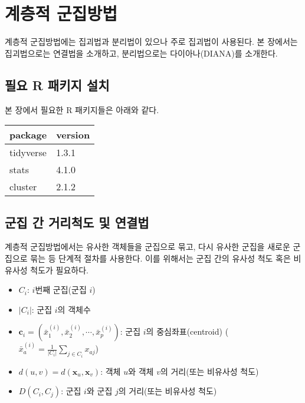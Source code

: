 \documentclass[
]{book}
\providecommand{\tightlist}{%
  \setlength{\itemsep}{0pt}\setlength{\parskip}{0pt}}
\begin{document}
\hypertarget{hierarchical-clustering}{%
\chapter{계층적 군집방법}\label{hierarchical-clustering}}

계층적 군집방법에는 집괴법과 분리법이 있으나 주로 집괴법이 사용된다. 본 장에서는 집괴법으로는 연결법을 소개하고, 분리법으로는 다이아나(DIANA)를 소개한다.

\hypertarget{hierarchical-clustering-packages-install}{%
\section{필요 R 패키지 설치}\label{hierarchical-clustering-packages-install}}

본 장에서 필요한 R 패키지들은 아래와 같다.

\begin{tabular}{l|l}
\hline
package & version\\
\hline
tidyverse & 1.3.1\\
\hline
stats & 4.1.0\\
\hline
cluster & 2.1.2\\
\hline
\end{tabular}

\hypertarget{distance-between-clusters}{%
\section{군집 간 거리척도 및 연결법}\label{distance-between-clusters}}

계층적 군집방법에서는 유사한 객체들을 군집으로 묶고, 다시 유사한 군집을 새로운 군집으로 묶는 등 단계적 절차를 사용한다. 이를 위해서는 군집 간의 유사성 척도 혹은 비유사성 척도가 필요하다.

\begin{itemize}
\tightlist
\item
  \(C_i\): \(i\)번째 군집(군집 \(i\))
\item
  \(|C_i|\): 군집 \(i\)의 객체수
\item
  \(\mathbf{c}_i = \left( \bar{x}_1^{(i)}, \bar{x}_2^{(i)}, \cdots, \bar{x}_p^{(i)} \right)\): 군집 \(i\)의 중심좌표(centroid) (\(\bar{x}_a^{(i)} = \frac{1}{|C_i|} \sum_{j \in C_i} x_{aj}\))
\item
  \(d(u, v) = d(\mathbf{x}_u, \mathbf{x}_v)\): 객체 \(u\)와 객체 \(v\)의 거리(또는 비유사성 척도)
\item
  \(D(C_i, C_j)\): 군집 \(i\)와 군집 \(j\)의 거리(또는 비유사성 척도)
\end{itemize}
\end{document}
